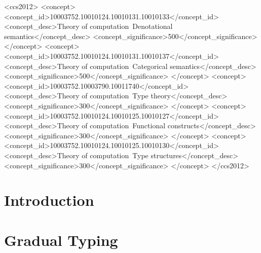 \documentclass[pacmpl,review,anonymous]{acmart}\settopmatter{printfolios=true}
\begin{document}
\begin{CCSXML}
<ccs2012>
<concept>
<concept_id>10003752.10010124.10010131.10010133</concept_id>
<concept_desc>Theory of computation~Denotational semantics</concept_desc>
<concept_significance>500</concept_significance>
</concept>
<concept>
<concept_id>10003752.10010124.10010131.10010137</concept_id>
<concept_desc>Theory of computation~Categorical semantics</concept_desc>
<concept_significance>500</concept_significance>
</concept>
<concept>
<concept_id>10003752.10003790.10011740</concept_id>
<concept_desc>Theory of computation~Type theory</concept_desc>
<concept_significance>300</concept_significance>
</concept>
<concept>
<concept_id>10003752.10010124.10010125.10010127</concept_id>
<concept_desc>Theory of computation~Functional constructs</concept_desc>
<concept_significance>300</concept_significance>
</concept>
<concept>
<concept_id>10003752.10010124.10010125.10010130</concept_id>
<concept_desc>Theory of computation~Type structures</concept_desc>
<concept_significance>300</concept_significance>
</concept>
</ccs2012>
\end{CCSXML}



\maketitle

\section{Introduction}
\label{sec:introduction}


\section{Gradual Typing}
\label{sec:gradual_typing}

\end{document}
